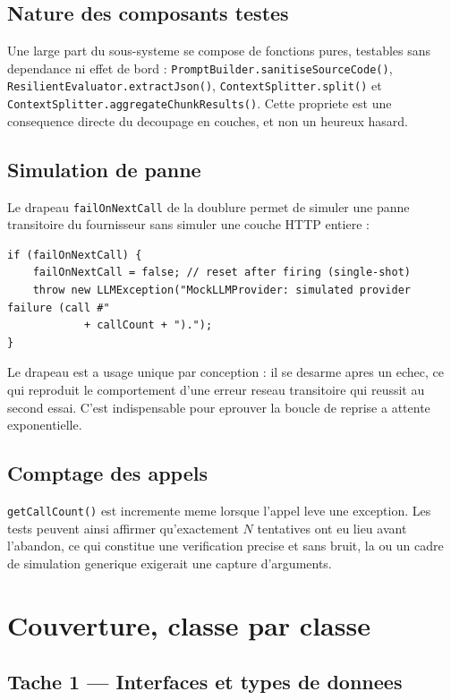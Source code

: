 \documentclass[12pt,a4paper]{article}
\begin{document}
\subsection{Nature des composants testes}

Une large part du sous-systeme se compose de fonctions pures, testables sans
dependance ni effet de bord : \texttt{PromptBuilder.sanitiseSourceCode()},
\texttt{ResilientEvaluator.extractJson()}, \texttt{ContextSplitter.split()} et
\texttt{ContextSplitter.aggregateChunkResults()}. Cette propriete est une
consequence directe du decoupage en couches, et non un heureux hasard.

\subsection{Simulation de panne}

Le drapeau \texttt{failOnNextCall} de la doublure permet de simuler une panne
transitoire du fournisseur sans simuler une couche HTTP entiere :

\begin{lstlisting}[caption={Declencheur de panne a usage unique}]
if (failOnNextCall) {
    failOnNextCall = false; // reset after firing (single-shot)
    throw new LLMException("MockLLMProvider: simulated provider failure (call #"
            + callCount + ").");
}
\end{lstlisting}

Le drapeau est a usage unique par conception : il se desarme apres un echec, ce
qui reproduit le comportement d'une erreur reseau transitoire qui reussit au
second essai. C'est indispensable pour eprouver la boucle de reprise a attente
exponentielle.

\subsection{Comptage des appels}

\texttt{getCallCount()} est incremente meme lorsque l'appel leve une exception.
Les tests peuvent ainsi affirmer qu'exactement $N$ tentatives ont eu lieu avant
l'abandon, ce qui constitue une verification precise et sans bruit, la ou un
cadre de simulation generique exigerait une capture d'arguments.

\section{Couverture, classe par classe}

\subsection{Tache 1 --- Interfaces et types de donnees}
\end{document}
